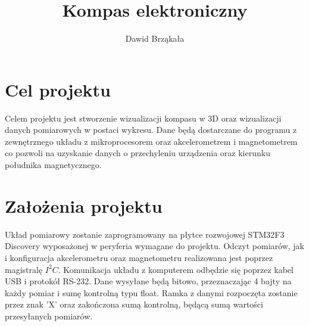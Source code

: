 \documentclass{article}
\title{Kompas elektroniczny}
\author{Dawid Brząkała}
\date{}
\begin{document}
\maketitle

\section{Cel projektu}
Celem projektu jest stworzenie wizualizacji kompasu w 3D oraz wizualizacji danych pomiarowych w postaci wykresu. Dane będą dostarczane do programu z zewnętrznego układu z mikroprocesorem oraz akcelerometrem i magnetometrem co pozwoli na uzyskanie danych o przechyleniu urządzenia oraz kierunku południka magnetycznego.

\section{Założenia projektu}
Układ pomiarowy zostanie zaprogramowany na płytce rozwojowej STM32F3 Discovery wyposażonej w peryferia wymagane do projektu. Odczyt pomiarów, jak i konfiguracja akcelerometru oraz magnetometru realizowana jest poprzez magistralę $I^2C$. Komunikacja układu z komputerem odbędzie się poprzez kabel USB i protokół RS-232. Dane wysyłane będą bitowo, przeznaczając 4 bajty na każdy pomiar i sumę kontrolną typu float. Ramka z danymi rozpoczęta zostanie przez znak 'X' oraz zakończona sumą kontrolną, będącą sumą  wartości przesyłanych pomiarów.
\end{document}

